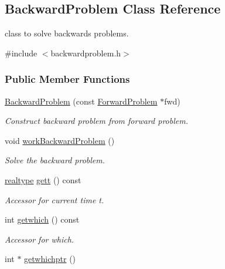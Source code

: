 \hypertarget{classamici_1_1_backward_problem}{}\subsection{Backward\+Problem Class Reference}
\label{classamici_1_1_backward_problem}


class to solve backwards problems.  




{\ttfamily \#include $<$backwardproblem.\+h$>$}

\subsubsection*{Public Member Functions}
\begin{DoxyCompactItemize}
\item 
\mbox{\hyperlink{classamici_1_1_backward_problem_a173995c3ce3a4c59d815dfbeebb8dc6e}{Backward\+Problem}} (const \mbox{\hyperlink{classamici_1_1_forward_problem}{Forward\+Problem}} $\ast$fwd)
\begin{DoxyCompactList}\small\item\em Construct backward problem from forward problem. \end{DoxyCompactList}\item 
void \mbox{\hyperlink{classamici_1_1_backward_problem_a4a17093ee76348cce97b06c94bf518bd}{work\+Backward\+Problem}} ()
\begin{DoxyCompactList}\small\item\em Solve the backward problem. \end{DoxyCompactList}\item 
\mbox{\hyperlink{namespaceamici_a1bdce28051d6a53868f7ccbf5f2c14a3}{realtype}} \mbox{\hyperlink{classamici_1_1_backward_problem_a1582a658df3f51a8c88b6f22b4205b3f}{gett}} () const
\begin{DoxyCompactList}\small\item\em Accessor for current time t. \end{DoxyCompactList}\item 
int \mbox{\hyperlink{classamici_1_1_backward_problem_ac337bf2284c1febeb302019b06c54c3e}{getwhich}} () const
\begin{DoxyCompactList}\small\item\em Accessor for which. \end{DoxyCompactList}\item 
int $\ast$ \mbox{\hyperlink{classamici_1_1_backward_problem_a209a0d59a5a5eebfba1e6db5cb209132}{getwhichptr}} ()

\end{DoxyCompactItemize}
